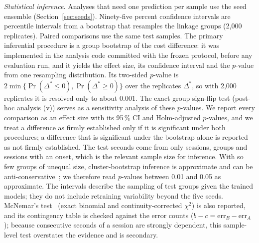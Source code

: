 \emph{Statistical inference.} Analyses that need one prediction per sample use the seed ensemble (Section~\ref{sec:seeds}). Ninety-five percent confidence intervals are percentile intervals from a bootstrap that resamples the \nGroupsEval{} linkage groups (2,000 replicates). Paired comparisons use the same test samples. The primary inferential procedure is a group bootstrap of the cost difference: it was implemented in the analysis code committed with the frozen protocol, before any evaluation run, and it yields the effect size, its confidence interval and the $p$-value from one resampling distribution. Its two-sided $p$-value is $2\min\{\Pr(\Delta^*\le0),\Pr(\Delta^*\ge0)\}$ over the replicates $\Delta^*$, so with 2,000 replicates it is resolved only to about 0.001. The exact group sign-flip test (post-hoc analysis (v)) serves as a sensitivity analysis of these $p$-values. We report every comparison as an effect size with its 95\,\% CI and Holm-adjusted $p$-values, and we treat a difference as firmly established only if it is significant under both procedures; a difference that is significant under the bootstrap alone is reported as not firmly established. The \nSamplesEval{} test seconds come from only \nSessionsEval{} sessions, \nGroupsEval{} groups and \nEventSessions{} sessions with an onset, which is the relevant sample size for inference. With so few groups of unequal size, cluster-bootstrap inference is approximate and can be anti-conservative~\cite{cameron2008bootstrap}; we therefore read $p$-values between 0.01 and 0.05 as approximate. The intervals describe the sampling of test groups given the trained models; they do not include retraining variability beyond the five seeds. McNemar's test~\cite{mcnemar1947,dietterich1998tests} (exact binomial and continuity-corrected $\chi^2$) is also reported, and its contingency table is checked against the error counts ($b-c=\mathrm{err}_B-\mathrm{err}_A$); because consecutive seconds of a session are strongly dependent, this sample-level test overstates the evidence and is secondary.

